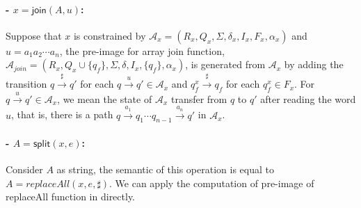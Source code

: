 \documentclass[12pt]{article}
\newcommand*{\aut}{\mathcal{A}}
\newcommand{\arrseparator}{\sharp}
\newcommand{\mysplit}{\mathsf{split}}
\newcommand{\myjoin}{\mathsf{join}}
\newcommand{\myset}[1]{\{#1\}}
\theoremstyle{remark}
\begin{document}
\paragraph{- $x = \myjoin(A,u)$:} Suppose that $x$ is constrained by $\aut_x=(R_x, Q_x, \Sigma, \delta_x, I_x, F_x, \alpha_x)$ and $u=a_1a_2\cdots a_n$, the pre-image for array join function, $\aut_{join}=(R_x, Q_x\cup\myset{q_f}, \Sigma, \delta, I_x, \myset{q_f}, \alpha_x)$, is generated from $\aut_x$ by adding the transition $q\xrightarrow{\arrseparator}q'$ for each $q\xrightarrow{u}q'\in\aut_x$ and $q_f^x\xrightarrow{\arrseparator}q_f$ for each $q_f^x\in F_x$. For $q\xrightarrow{u}q'\in \aut_x$, we mean the state of $\aut_x$ transfer from $q$ to $q'$ after reading the word $u$, that is, there is a path $q\xrightarrow{a_1}q_1\cdots q_{n-1}\xrightarrow{a_n}q'$ in $\aut_x$. 

\paragraph{- $A = \mysplit(x, e)$:} Consider $A$ as string, the semantic of this operation is equal to $A = replaceAll(x, e, \arrseparator)$. We can apply the computation of pre-image of replaceAll function in \cite{ostrich} directly.



\end{document}
